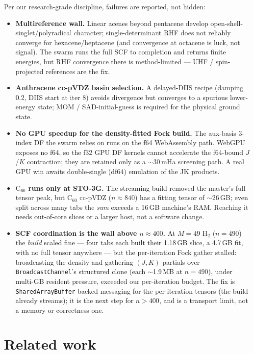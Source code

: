 \documentclass[11pt]{article}
\newcommand{\Csixty}{\ensuremath{\mathrm{C}_{60}}}
\begin{document}
Per our research-grade discipline, failures are reported, not hidden:
\begin{itemize}
  \item \textbf{Multireference wall.} Linear acenes beyond pentacene develop
  open-shell-singlet/polyradical character; single-determinant RHF does not
  reliably converge for hexacene/heptacene (and convergence at octacene is
  luck, not signal). The swarm runs the full SCF to completion and returns
  finite energies, but RHF convergence there is method-limited --- UHF /
  spin-projected references are the fix.
  \item \textbf{Anthracene cc-pVDZ basin selection.} A delayed-DIIS recipe
  (damping 0.2, DIIS start at iter 8) avoids divergence but converges to a
  spurious lower-energy state; MOM / SAD-initial-guess is required for the
  physical ground state.
  \item \textbf{No GPU speedup for the density-fitted Fock build.} The
  aux-basis 3-index DF the swarm relies on runs on the f64
  WebAssembly path. WebGPU exposes no f64, so the f32 GPU DF kernels cannot
  accelerate the f64-bound $J$/$K$ contraction; they are retained only as a
  $\sim$30\,mHa screening path. A real GPU win awaits double-single (df64)
  emulation of the JK products.
  \item \textbf{\Csixty{} runs only at STO-3G.} The streaming build removed the
  master's full-tensor peak, but \Csixty{} cc-pVDZ ($n\approx840$) has a fitting
  tensor of $\sim$26\,GB; even split across many tabs the \emph{sum} exceeds a
  16\,GB machine's RAM. Reaching it needs out-of-core slices or a larger host,
  not a software change.
  \item \textbf{SCF coordination is the wall above $n\approx400$.} At $M{=}49$
  H$_2$ ($n{=}490$) the \emph{build} scaled fine --- four tabs each built their
  1.18\,GB slice, a 4.7\,GB fit, with no full tensor anywhere --- but the
  per-iteration Fock gather stalled: broadcasting the density and gathering
  $(J,K)$ partials over \texttt{BroadcastChannel}'s structured clone (each
  $\sim$1.9\,MB at $n{=}490$), under multi-GB resident pressure, exceeded our
  per-iteration budget. The fix is \texttt{SharedArrayBuffer}-backed messaging
  for the per-iteration tensors (the build already streams); it is the next step
  for $n>400$, and is a transport limit, not a memory or correctness one.
\end{itemize}

\section{Related work}
\label{sec:related}
\end{document}

